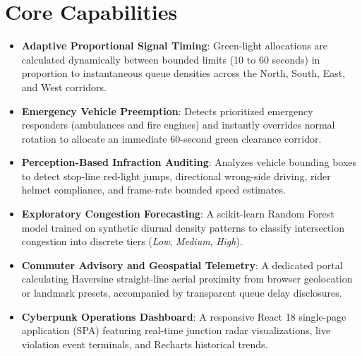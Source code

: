 \section{Core Capabilities}
\begin{itemize}[leftmargin=*]
    \item \textbf{Adaptive Proportional Signal Timing}: Green-light allocations are calculated dynamically between bounded limits (10 to 60 seconds) in proportion to instantaneous queue densities across the North, South, East, and West corridors.
    \item \textbf{Emergency Vehicle Preemption}: Detects prioritized emergency responders (ambulances and fire engines) and instantly overrides normal rotation to allocate an immediate 60-second green clearance corridor.
    \item \textbf{Perception-Based Infraction Auditing}: Analyzes vehicle bounding boxes to detect stop-line red-light jumps, directional wrong-side driving, rider helmet compliance, and frame-rate bounded speed estimates.
    \item \textbf{Exploratory Congestion Forecasting}: A scikit-learn Random Forest model trained on synthetic diurnal density patterns to classify intersection congestion into discrete tiers (\textit{Low}, \textit{Medium}, \textit{High}).
    \item \textbf{Commuter Advisory and Geospatial Telemetry}: A dedicated portal calculating Haversine straight-line aerial proximity from browser geolocation or landmark presets, accompanied by transparent queue delay disclosures.
    \item \textbf{Cyberpunk Operations Dashboard}: A responsive React 18 single-page application (SPA) featuring real-time junction radar visualizations, live violation event terminals, and Recharts historical trends.
\end{itemize}

